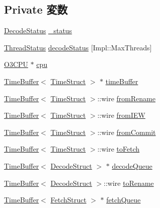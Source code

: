 \subsection*{Private 変数}
\begin{DoxyCompactItemize}
\item 
\hyperlink{classDefaultDecode_a92cfc320e0bf43339d34c50c65be3d71}{DecodeStatus} \hyperlink{classDefaultDecode_a69375c9c0bc115c0f1a90b7967abfa6a}{\_\-status}
\item 
\hyperlink{classDefaultDecode_ae2739961013a00cede621d4d72f2173c}{ThreadStatus} \hyperlink{classDefaultDecode_a1d8482258ad490dd3485ac43d127ce4d}{decodeStatus} \mbox{[}Impl::MaxThreads\mbox{]}
\item 
\hyperlink{classDefaultDecode_a44622cf06940413482836cb62931ac3f}{O3CPU} $\ast$ \hyperlink{classDefaultDecode_a1379cf882a12ac6fc9eba5da7c84b18b}{cpu}
\item 
\hyperlink{classTimeBuffer}{TimeBuffer}$<$ \hyperlink{structTimeStruct}{TimeStruct} $>$ $\ast$ \hyperlink{classDefaultDecode_a83f9ee976e732665aeb08dbc19acfd45}{timeBuffer}
\item 
\hyperlink{classTimeBuffer}{TimeBuffer}$<$ \hyperlink{structTimeStruct}{TimeStruct} $>$::wire \hyperlink{classDefaultDecode_ae99c54a9c8f1e218b86afcee348c54fc}{fromRename}
\item 
\hyperlink{classTimeBuffer}{TimeBuffer}$<$ \hyperlink{structTimeStruct}{TimeStruct} $>$::wire \hyperlink{classDefaultDecode_a6c9093e88770a58dc8853f49a09bbac8}{fromIEW}
\item 
\hyperlink{classTimeBuffer}{TimeBuffer}$<$ \hyperlink{structTimeStruct}{TimeStruct} $>$::wire \hyperlink{classDefaultDecode_a0055a92bd94eda21c2641d46ff013dac}{fromCommit}
\item 
\hyperlink{classTimeBuffer}{TimeBuffer}$<$ \hyperlink{structTimeStruct}{TimeStruct} $>$::wire \hyperlink{classDefaultDecode_acc94cfae2a67b5dbb0e74e81c24a3b6e}{toFetch}
\item 
\hyperlink{classTimeBuffer}{TimeBuffer}$<$ \hyperlink{classDefaultDecode_a38077cd156cf219016abf92d8c5b523b}{DecodeStruct} $>$ $\ast$ \hyperlink{classDefaultDecode_a7860fc5736574343c9e294cb2bef9d93}{decodeQueue}
\item 
\hyperlink{classTimeBuffer}{TimeBuffer}$<$ \hyperlink{classDefaultDecode_a38077cd156cf219016abf92d8c5b523b}{DecodeStruct} $>$::wire \hyperlink{classDefaultDecode_ac096c67e7877c089a5417aa83a721edc}{toRename}
\item 
\hyperlink{classTimeBuffer}{TimeBuffer}$<$ \hyperlink{classDefaultDecode_a3aac8607069f16898ef53cfaa2d97aeb}{FetchStruct} $>$ $\ast$ \hyperlink{classDefaultDecode_a9a2f350be647ebfb6567172812db491a}{fetchQueue}

\end{DoxyCompactItemize}
